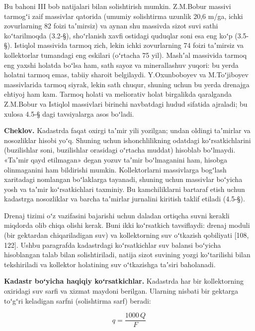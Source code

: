 Bu bahoni III bob natijalari bilan solishtirish mumkin. Z.M.Bobur
massivi tarmogʻi zaif massivlar qatorida (umumiy solishtirma uzunlik
20,6 m/ga, ichki zovurlarning 82 foizi taʼmirsiz) va aynan shu massivda
sizot suvi sathi koʻtarilmoqda (3.2-§), shoʻrlanish xavfi ostidagi
quduqlar soni esa eng koʻp (3.5-§). Istiqlol massivida tarmoq zich,
lekin ichki zovurlarning 74 foizi taʼmirsiz va kollektorlar tumandagi
eng eskilari (oʻrtacha 75 yil). Mashʼal massivida tarmoq eng yaxshi
holatda boʻlsa ham, sath sayoz va minerallashuv yuqori: bu yerda holatni
tarmoq emas, tabiiy sharoit belgilaydi. Y.Oxunboboyev va M.Toʻjiboyev
massivlarida tarmoq siyrak, lekin sath chuqur, shuning uchun bu yerda
drenajga ehtiyoj ham kam. Tarmoq holati va meliorativ holat birgalikda
qaralganda Z.M.Bobur va Istiqlol massivlari birinchi navbatdagi hudud
sifatida ajraladi; bu xulosa 4.5-§ dagi tavsiyalarga asos boʻladi.

\textbf{Cheklov.} Kadastrda faqat oxirgi taʼmir yili yozilgan; undan
oldingi taʼmirlar va nosozliklar hisobi yoʻq. Shuning uchun
ishonchlilikning odatdagi koʻrsatkichlarini (buzilishlar soni,
buzilishlar orasidagi oʻrtacha muddat) hisoblab boʻlmaydi. «Taʼmir qayd
etilmagan» degan yozuv taʼmir boʻlmaganini ham, hisobga olinmaganini ham
bildirishi mumkin. Kollektorlarni massivlarga bogʻlash xaritadagi
nomlangan boʻlaklarga tayanadi, shuning uchun massivlar boʻyicha yosh va
taʼmir koʻrsatkichlari taxminiy. Bu kamchiliklarni bartaraf etish uchun
kadastrga nosozliklar va barcha taʼmirlar jurnalini kiritish taklif
etiladi (4.5-§).


Drenaj tizimi oʻz vazifasini bajarishi uchun daladan ortiqcha suvni
kerakli miqdorda olib chiqa olishi kerak. Buni ikki koʻrsatkich
tavsiflaydi: drenaj moduli (bir gektardan chiqariladigan suv) va
kollektorning suv oʻtkazish qobiliyati {[}108, 122{]}. Ushbu paragrafda
kadastrdagi koʻrsatkichlar suv balansi boʻyicha hisoblangan talab bilan
solishtiriladi, natija sizot suvining yozgi koʻtarilishi bilan
tekshiriladi va kollektor holatining suv oʻtkazishga taʼsiri baholanadi.

\textbf{Kadastr boʻyicha haqiqiy koʻrsatkichlar.} Kadastrda har bir
kollektorning oxiridagi suv sarfi va xizmat maydoni berilgan. Ularning
nisbati bir gektarga toʻgʻri keladigan sarfni (solishtirma sarf) beradi:

\begin{equation}\tag{4.1}
q = \frac{1000 \, Q}{F}
\end{equation}

